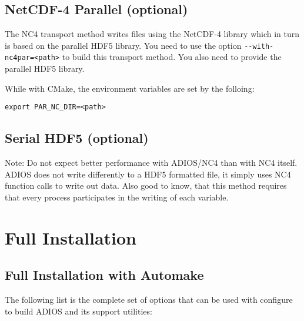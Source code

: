 \subsection{NetCDF-4 Parallel (optional)}

The NC4 transport method writes files using the NetCDF-4 library which in turn 
is based on the parallel HDF5 library. You need to use the option 
\verb+--with-nc4par=<path>+ to build this transport method. 
You also need to provide the parallel HDF5 library. 

While with CMake, the environment variables are set by the folloing:
\begin{lstlisting}
export PAR_NC_DIR=<path>
\end{lstlisting}

\subsection{Serial HDF5 (optional)}
Note: Do not expect better performance with ADIOS/NC4 than with NC4 itself. ADIOS does not write differently to a HDF5 formatted file, it simply uses NC4 function calls to write out data. Also good to know, that this method requires that every process participates in the writing of each variable. 

\section{Full Installation}

\subsection{Full Installation with Automake}

The following list is the complete set of options that can be used with 
configure to build ADIOS and its support utilities:

